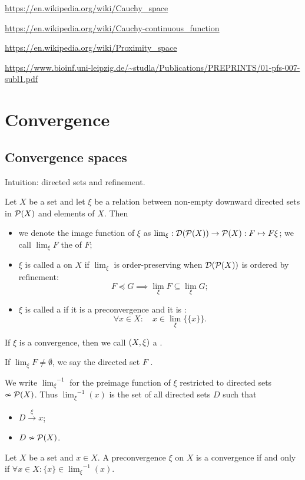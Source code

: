 \url{https://en.wikipedia.org/wiki/Cauchy_space}

\url{https://en.wikipedia.org/wiki/Cauchy-continuous_function}

\url{https://en.wikipedia.org/wiki/Proximity_space}

\url{https://www.bioinf.uni-leipzig.de/~studla/Publications/PREPRINTS/01-pfs-007-subl1.pdf}

\chapter{Convergence}
\section{Convergence spaces}
Intuition: directed sets and refinement.

\begin{definition}
Let $X$ be a set and let $\xi$ be a relation between non-empty downward directed sets in $\operatorname{\mathcal{P}}(X)$ and elements of $X$. Then
\begin{itemize}
\item we denote the image function of $\xi$ as $\lim_\xi: \operatorname{\mathcal{D}}(\operatorname{\mathcal{P}}(X)) \to \operatorname{\mathcal{P}}(X): F\mapsto F\xi$; we call $\lim_\xi F$ the  of $F$;
\item $\xi$ is called a  on $X$ if $\lim_\xi$ is order-preserving when $\operatorname{\mathcal{D}}(\operatorname{\mathcal{P}}(X))$ is ordered by refinement:
\[ F \preceq G \implies \lim_\xi F \subseteq \lim_\xi G; \]
\item $\xi$ is called a  if it is a preconvergence and it is :
\[ \forall x\in X: \quad x\in \lim_\xi \big\{\{x\}\big\}. \]
\end{itemize}
If $\xi$ is a convergence, then we call $\sSet{X, \xi}$ a .

If $\lim_\xi F \neq \emptyset$, we say the directed set $F$ .
\end{definition}
We write ${\lim_\xi}^{-1}$ for the preimage function of $\xi$ restricted to directed sets $\nsim \operatorname{\mathcal{P}}(X)$. Thus ${\lim_\xi}^{-1}(x)$ is the set of all directed sets $D$ such that
\begin{itemize}
\item $D\overset{\xi}{\longrightarrow} x$;
\item $D \nsim \operatorname{\mathcal{P}}(X)$.
\end{itemize}

\begin{lemma}
Let $X$ be a set and $x\in X$. A preconvergence $\xi$ on $X$ is a convergence \textup{if and only if} $\forall x\in X: \{x\} \in {\lim_\xi}^{-1}(x)$.
\end{lemma}

